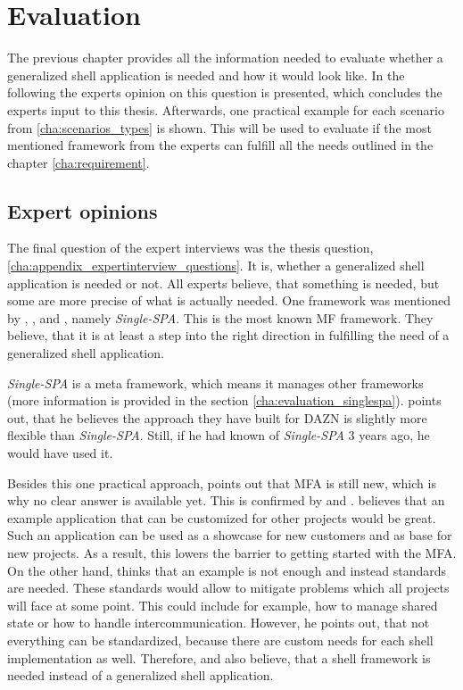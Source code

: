 
\chapter{Evaluation}\label{cha:evaluation}

The previous chapter provides all the information needed to evaluate whether a generalized shell application is needed and how it would look like.
In the following the experts opinion on this question is presented, which concludes the experts input to this thesis.
Afterwards, one practical example for each scenario from \ref{cha:scenarios_types} is shown.
This will be used to evaluate if the most mentioned framework from the experts can fulfill all the needs outlined in the chapter \ref{cha:requirement}.





\section{Expert opinions}\label{cha:evaluation_experts}

The final question of the expert interviews was the thesis question, \ref{cha:appendix_expertinterview_questions}.
It is, whether a generalized shell application is needed or not.
All experts believe, that something is needed, but some are more precise of what is actually needed.
One framework was mentioned by \textciteRehm{}, \textciteMezzalira{}, \textciteJovanovic{} and \textciteSteyer{}, namely \textit{Single-SPA}.
This is the most known \ac{MF} framework.
They believe, that it is at least a step into the right direction in fulfilling the need of a generalized shell application.

\textit{Single-SPA} is a meta framework, which means it manages other frameworks (more information is provided in the section \ref{cha:evaluation_singlespa}).
\citeauthorMezzalira{} points out, that he believes the approach they have built for DAZN is slightly more flexible than \textit{Single-SPA}.
Still, if he had known of \textit{Single-SPA} 3 years ago, he would have used it.

Besides this one practical approach, \textciteHuber{} points out that \ac{MFA} is still new, which is why no clear answer is available yet.
This is confirmed by \textciteJovanovic{} and \textciteOlleck{}.
\citeauthorJovanovic{} believes that an example application that can be customized for other projects would be great.
Such an application can be used as a showcase for new customers and as base for new projects.
As a result, this lowers the barrier to getting started with the \ac{MFA}.
On the other hand, \citeauthorOlleck{} thinks that an example is not enough and instead standards are needed.
These standards would allow to mitigate problems which all projects will face at some point.
This could include for example, how to manage shared state or how to handle intercommunication.
However, he points out, that not everything can be standardized, because there are custom needs for each shell implementation as well.
Therefore, \citeauthorOlleck{} and also \citeauthorSteyer{} believe, that a shell framework is needed instead of a generalized shell application.

